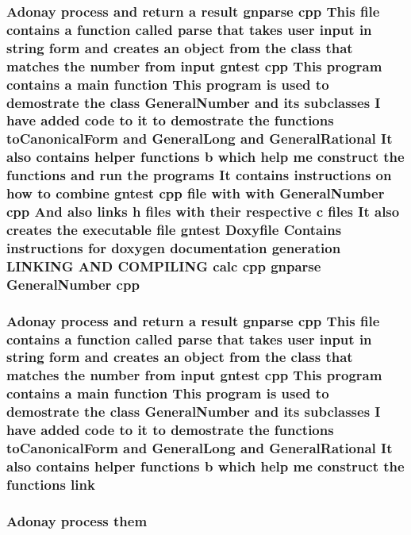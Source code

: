 \subsubsection[{cpp}]{\setlength{\rightskip}{0pt plus 5cm}Adonay process and return a result gnparse cpp This file contains a function called parse that takes user input in string form and creates an object from the class that matches the number from input gntest cpp This program contains a {\bf main} function This program is used to demostrate the class {\bf General\+Number} and its subclasses I have added code to it to demostrate the functions {\bf to\+Canonical\+Form} and {\bf General\+Long} and {\bf General\+Rational} It also contains helper functions b which help me construct the functions and run the programs It contains instructions on how to combine gntest cpp file with with {\bf General\+Number} cpp And also links h files with their respective c files It also creates the executable file gntest Doxyfile Contains instructions for doxygen documentation generation L\+I\+N\+K\+I\+NG A\+ND C\+O\+M\+P\+I\+L\+I\+NG calc cpp gnparse {\bf General\+Number} cpp}\label{readme_8txt_a59b5ab35f6d704e47d879c46badde879}
\subsubsection[{link}]{\setlength{\rightskip}{0pt plus 5cm}Adonay process and return a result gnparse {\bf cpp} This file contains a function called parse that takes user input in string form and creates an object from the class that matches the number from input gntest {\bf cpp} This program contains a {\bf main} function This program is used to demostrate the class {\bf General\+Number} and its subclasses I have added code to it to demostrate the functions {\bf to\+Canonical\+Form} and {\bf General\+Long} and {\bf General\+Rational} It also contains helper functions b which help me construct the functions link}\label{readme_8txt_a8a716d905feeb8de7ac24652addf7043}
\subsubsection[{them}]{\setlength{\rightskip}{0pt plus 5cm}Adonay process them}\label{readme_8txt_ad94309c04f0c3fbcddf4c96f79ff2435}
